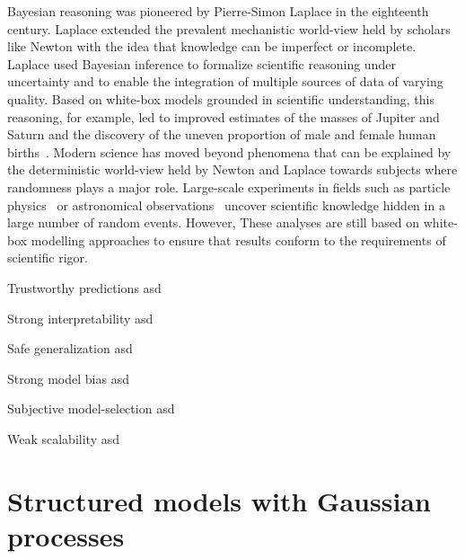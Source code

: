 Bayesian reasoning was pioneered by Pierre-Simon Laplace in the eighteenth century.
Laplace extended the prevalent mechanistic world-view held by scholars like Newton with the idea that knowledge can be imperfect or incomplete.
Laplace used Bayesian inference to formalize scientific reasoning under uncertainty and to enable the integration of multiple sources of data of varying quality.
Based on white-box models grounded in scientific understanding, this reasoning, for example, led to improved estimates of the masses of Jupiter and Saturn and the discovery of the uneven proportion of male and female human births~\parencite{pulskamp_laplace_2020,laplace_theorie_1820}.
Modern science has moved beyond phenomena that can be explained by the deterministic world-view held by Newton and Laplace towards subjects where randomness plays a major role.
Large-scale experiments in fields such as particle physics~\parencite{khachatryan_observation_2015} or astronomical observations~\parencite{collaboration_first_2019,the_ligo_scientific_collaboration_observation_2016} uncover scientific knowledge hidden in a large number of random events.
However, These analyses are still based on white-box modelling approaches to ensure that results conform to the requirements of scientific rigor.


\begin{Pros}
    \begin{compactdesc}
        \item[Trustworthy predictions] asd
        \item[Strong interpretability] asd
        \item[Safe generalization] asd
    \end{compactdesc}
\end{Pros}
\begin{Cons}
    \begin{compactdesc}
        \item[Strong model bias] asd
        \item[Subjective model-selection] asd
        \item[Weak scalability] asd
    \end{compactdesc}
\end{Cons}


\section{Structured models with Gaussian processes}


